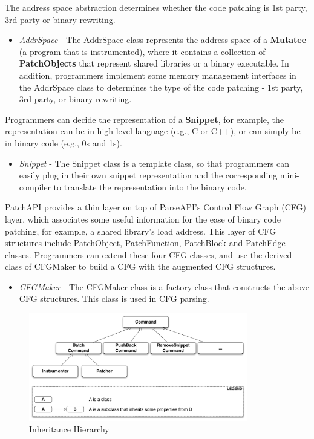The address space abstraction determines whether the code patching is 1st party,
3rd party or binary rewriting.
\begin{itemize}
\item \emph{AddrSpace} - The AddrSpace class represents the address space of a
  \textbf{Mutatee} (a program that is instrumented), where it contains a
  collection of \textbf{PatchObjects} that represent shared libraries or a
  binary executable. In addition, programmers implement some memory management
  interfaces in the AddrSpace class to determines the type of the code patching
  - 1st party, 3rd party, or binary rewriting.
\end{itemize}
Programmers can decide the representation of a \textbf{Snippet}, for example, the
representation can be in high level language (e.g., C or C++), or can simply be
in binary code (e.g., 0s and 1s).
\begin{itemize}
\item \emph{Snippet} - The Snippet class is a template class, so that programmers can
    easily plug in their own snippet representation and the corresponding
    mini-compiler to translate the representation into the binary code.
\end{itemize}
PatchAPI provides a thin layer on top of ParseAPI's Control Flow Graph (CFG)
layer, which associates some useful information for the ease of binary code
patching, for example, a shared library's load address. This layer of CFG
structures include PatchObject, PatchFunction, PatchBlock and PatchEdge classes.
Programmers can extend these four CFG classes, and use the derived class of
CFGMaker to build a CFG with the augmented CFG structures.

\begin{itemize}
\item \emph{CFGMaker} - The CFGMaker class is a factory class that constructs the above
    CFG structures. This class is used in CFG parsing.

\end{itemize}
\begin{figure}[ht!]
\centerline{\includegraphics[width=0.85\textwidth]{./figure/command/img.pdf}}
\caption{\label{fig:inh}Inheritance Hierarchy}
\end{figure}


